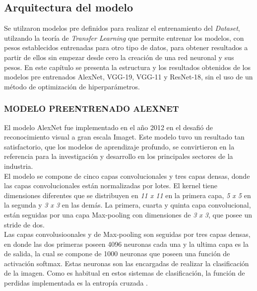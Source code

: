 \subsection{Arquitectura del modelo}

Se utilzaron modelos pre definidos para realizar el entrenamiento del \textit{Dataset}, utilzando la teoría de \textit{Transfer Learning} que permite entrenar los modelos, con pesos establecidos entrenadas para otro tipo de datos, para obtener resultados a partir de ellos sin empezar desde cero la creación de una red neuronal y sus pesos. En este capítulo se presenta la estructura y los resultados obtenidos de los modelos pre entrenados AlexNet, VGG-19, VGG-11 y ResNet-18, sin el uso de un método de optimización de hiperparámetros.

\subsubsection{\MakeUppercase{Modelo preentrenado ALEXNET}}

El modelo AlexNet fue implementado en el año 2012 en el desafió de reconocimiento visual a gran escala Imaget. Este modelo tuvo un resultado tan satisfactorio, que los modelos de aprendizaje profundo, se convirtieron en la referencia para la investigación y desarrollo en los principales sectores de la industria. \cite{Pytorch}\\


El modelo se compone de cinco capas convolucionales y tres capas densas, donde las capas convolucionales están normalizadas por lotes. El kernel tiene dimensiones diferentes que se distribuyen en \textit{11 x 11} en la primera capa, \textit{5 x 5} en la segunda y \textit{3 x 3} en las demás. La primera, cuarta y quinta capa convolucional, están seguidas por una capa Max-pooling con dimensiones de \textit{3 x 3}, que posee un stride de dos.\\


Las capas convolusioonales y de Max-pooling son seguidas por tres capas densas, en donde las dos primeras poseen 4096 neuronas cada una y la ultima capa es la de salida, la cual se compone de 1000 neuronas que poseen una función de activación softmax. Estas neuronas son las encargadas de realizar la clasificación de la imagen. Como es habitual en estos sistemas de clasificación, la función de perdidas implementada es la entropía cruzada \cite{ref_1}.\\

\newpage

